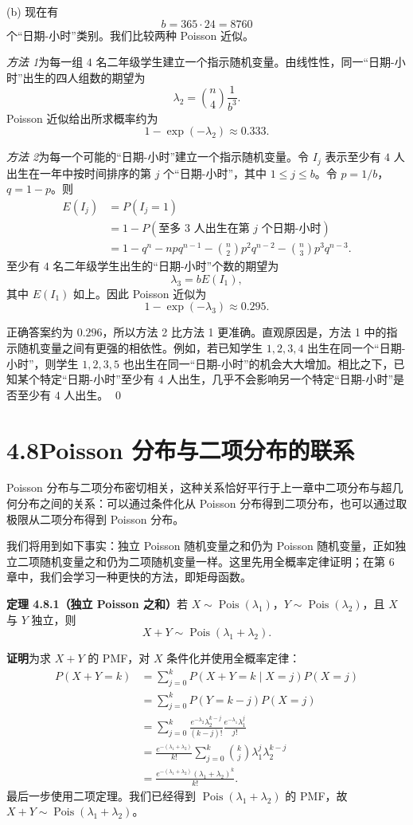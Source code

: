 \documentclass[UTF8,12pt,a4paper,fontset=fandol]{ctexart}
\begin{document}
(b) 现在有
\[
  b=365\cdot 24=8760
\]
个“日期-小时”类别。我们比较两种 Poisson 近似。

\noindent\textit{方法 1}\quad 为每一组 $4$ 名二年级学生建立一个指示随机变量。由线性性，同一“日期-小时”出生的四人组数的期望为
\[
  \lambda_2=\binom{n}{4}\frac{1}{b^3}.
\]
Poisson 近似给出所求概率约为
\[
  1-\exp(-\lambda_2)\approx 0.333.
\]

\noindent\textit{方法 2}\quad 为每一个可能的“日期-小时”建立一个指示随机变量。令 $I_j$ 表示至少有 $4$ 人出生在一年中按时间排序的第 $j$ 个“日期-小时”，其中 $1\le j\le b$。令 $p=1/b$，$q=1-p$。则
\[
\begin{aligned}
  E(I_j)&=P(I_j=1)\\
  &=1-P(\text{至多 }3\text{ 人出生在第 }j\text{ 个日期-小时})\\
  &=1-q^n-npq^{n-1}-\binom{n}{2}p^2q^{n-2}-\binom{n}{3}p^3q^{n-3}.
\end{aligned}
\]
至少有 $4$ 名二年级学生出生的“日期-小时”个数的期望为
\[
  \lambda_3=bE(I_1),
\]
其中 $E(I_1)$ 如上。因此 Poisson 近似为
\[
  1-\exp(-\lambda_3)\approx 0.295.
\]

正确答案约为 $0.296$，所以方法 2 比方法 1 更准确。直观原因是，方法 1 中的指示随机变量之间有更强的相依性。例如，若已知学生 $1,2,3,4$ 出生在同一个“日期-小时”，则学生 $1,2,3,5$ 也出生在同一“日期-小时”的机会大大增加。相比之下，已知某个特定“日期-小时”至少有 $4$ 人出生，几乎不会影响另一个特定“日期-小时”是否至少有 $4$ 人出生。 \qed

\section*{4.8\quad Poisson 分布与二项分布的联系}

Poisson 分布与二项分布密切相关，这种关系恰好平行于上一章中二项分布与超几何分布之间的关系：可以通过条件化从 Poisson 分布得到二项分布，也可以通过取极限从二项分布得到 Poisson 分布。

我们将用到如下事实：独立 Poisson 随机变量之和仍为 Poisson 随机变量，正如独立二项随机变量之和仍为二项随机变量一样。这里先用全概率定律证明；在第 6 章中，我们会学习一种更快的方法，即矩母函数。

\noindent\textbf{定理 4.8.1（独立 Poisson 之和）}\quad 若 $X\sim\operatorname{Pois}(\lambda_1)$，$Y\sim\operatorname{Pois}(\lambda_2)$，且 $X$ 与 $Y$ 独立，则
\[
  X+Y\sim\operatorname{Pois}(\lambda_1+\lambda_2).
\]

\noindent\textbf{证明}\quad 为求 $X+Y$ 的 PMF，对 $X$ 条件化并使用全概率定律：
\[
\begin{aligned}
  P(X+Y=k)
  &=\sum_{j=0}^k P(X+Y=k\mid X=j)P(X=j)\\
  &=\sum_{j=0}^k P(Y=k-j)P(X=j)\\
  &=\sum_{j=0}^k
    \frac{e^{-\lambda_2}\lambda_2^{k-j}}{(k-j)!}
    \frac{e^{-\lambda_1}\lambda_1^j}{j!}\\
  &=\frac{e^{-(\lambda_1+\lambda_2)}}{k!}
    \sum_{j=0}^k\binom{k}{j}\lambda_1^j\lambda_2^{k-j}\\
  &=\frac{e^{-(\lambda_1+\lambda_2)}(\lambda_1+\lambda_2)^k}{k!}.
\end{aligned}
\]
最后一步使用二项定理。我们已经得到 $\operatorname{Pois}(\lambda_1+\lambda_2)$ 的 PMF，故 $X+Y\sim\operatorname{Pois}(\lambda_1+\lambda_2)$。
\end{document}
